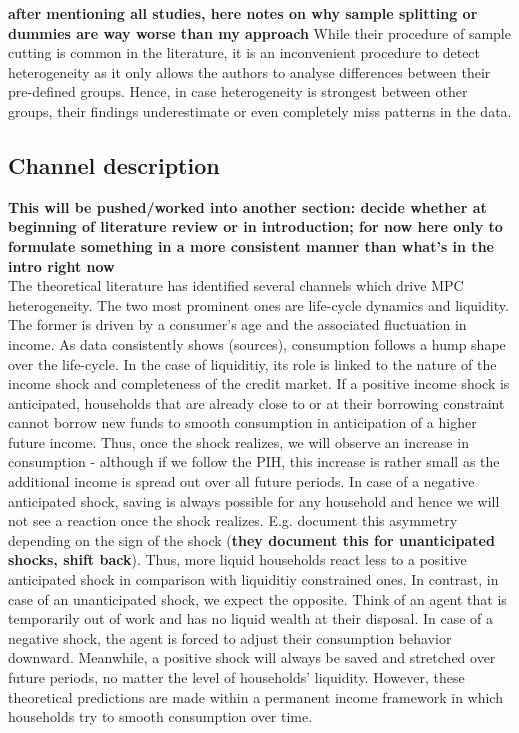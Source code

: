 \textbf{after mentioning all studies, here notes on why sample splitting or dummies are way worse than my approach}
While their procedure of sample cutting is common in the literature, it is an inconvenient procedure to detect heterogeneity as it only allows the authors to analyse differences between their pre-defined groups. Hence, in case heterogeneity is strongest between other groups, their findings underestimate or even completely miss patterns in the data.

\subsection{Channel description}
\textbf{This will be pushed/worked into another section: decide whether at beginning of literature review or in introduction; for now here only to formulate something in a more consistent manner than what's in the intro right now} \\
The theoretical literature has identified several channels which drive MPC heterogeneity. The two most prominent ones are life-cycle dynamics and liquidity. The former is driven by a consumer's age and the associated fluctuation in income. As data consistently shows (sources), consumption follows a hump shape over the life-cycle. In the case of liquiditiy, its role is linked to the nature of the income shock and completeness of the credit market. If a positive income shock is anticipated, households that are already close to or at their borrowing constraint cannot borrow new funds to smooth consumption in anticipation of a higher future income. Thus, once the shock realizes, we will observe an increase in consumption - although if we follow the PIH, this increase is rather small as the additional income is spread out over all future periods. In case of a negative anticipated shock, saving is always possible for any household and hence we will not see a reaction once the shock realizes. E.g. \cite{bunn_etal} document this asymmetry depending on the sign of the shock (\textbf{they document this for unanticipated shocks, shift back}). Thus, more liquid households react less to a positive anticipated shock in comparison with liquiditiy constrained ones. In contrast, in case of an unanticipated shock, we expect the opposite. Think of an agent that is temporarily out of work and has no liquid wealth at their disposal. In case of a negative shock, the agent is forced to adjust their consumption behavior downward. Meanwhile, a positive shock will always be saved and stretched over future periods, no matter the level of households' liquidity. However, these theoretical predictions are made within a permanent income framework in which households try to smooth consumption over time.\\ 
